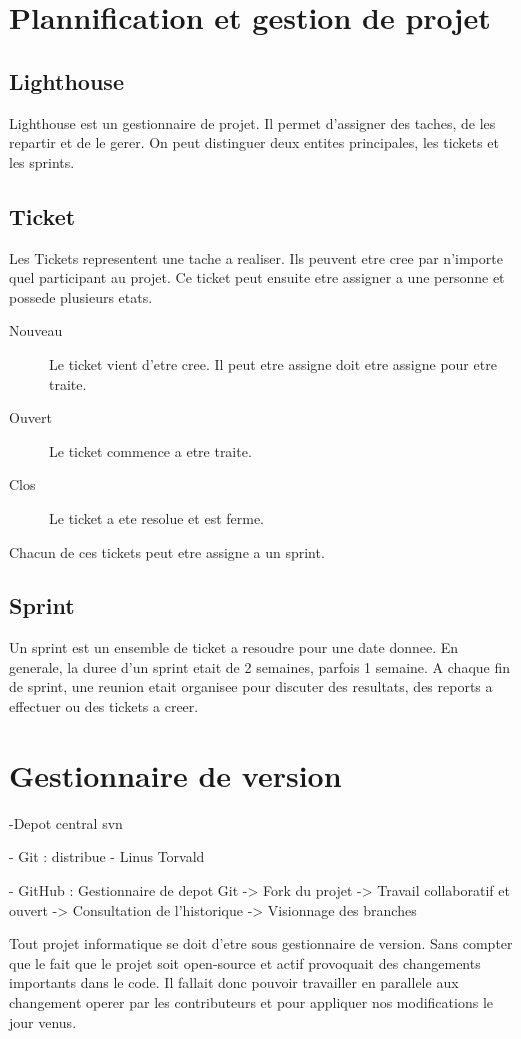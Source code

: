 \section{Plannification et gestion de projet}
\subsection{Lighthouse}
Lighthouse est un gestionnaire de projet. Il permet d'assigner des taches, de les repartir et de le gerer. On peut distinguer deux entites principales, les tickets et les sprints.
\subsection{Ticket}
Les Tickets representent une tache a realiser. Ils peuvent etre cree par n'importe quel participant au projet. Ce ticket peut ensuite etre assigner a une personne et possede plusieurs etats.
\begin{description}
\item[Nouveau] Le ticket vient d'etre cree. Il peut etre assigne doit etre assigne pour etre traite.
\item[Ouvert] Le ticket commence a etre traite.
\item[Clos] Le ticket a ete resolue et est ferme.
\end{description}
Chacun de ces tickets peut etre assigne a un sprint.
\subsection{Sprint}
Un sprint est un ensemble de ticket a resoudre pour une date donnee. En generale, la duree d'un sprint etait de 2 semaines, parfois 1 semaine. A chaque fin de sprint, une reunion etait organisee pour discuter des resultats, des reports a effectuer ou des tickets a creer.
\section{Gestionnaire de version}
-Depot central svn

- Git : distribue
- Linus Torvald

- GitHub : Gestionnaire de depot Git
-> Fork du projet
-> Travail collaboratif et ouvert 
-> Consultation de l'historique
-> Visionnage des branches

Tout projet informatique se doit d'etre sous gestionnaire de version. Sans compter que le fait que le projet soit open-source et actif provoquait des changements importants dans le code. Il fallait donc pouvoir travailler en parallele aux changement operer par les contributeurs et pour appliquer nos modifications le jour venus.

